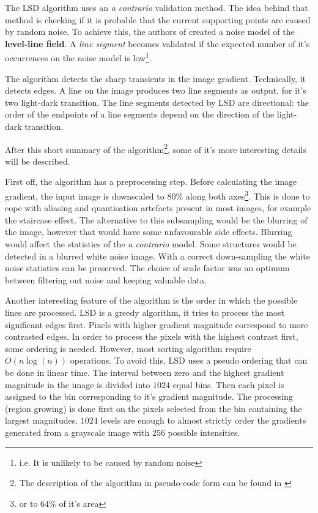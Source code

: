The LSD algorithm uses an \textit{a contrario} validation method.
The idea behind that method is checking if it is probable that the current supporting points are caused by random noise.
To achieve this, the authors of \cite{LSDDet} created a noise model of the \textbf{level-line field}.
A \textit{line segment} becomes validated if the expected number of it's occurrences on the noise model is low\footnote{i.e. It is unlikely to be caused by random noise}.

The algorithm detects the sharp transients in the image gradient.
Technically, it detects edges.
A line on the image produces two line segments as output, for it's two light-dark transition.
The line segments detected by LSD are directional: the order of the endpoints of a line segments depend on the direction of the light-dark transition.

After this short summary of the algorithm\footnote{The description of the algorithm in pseudo-code form can be found in \cite{LSDDet}}, some of it's more interesting details will be described.

First off, the algorithm has a preprocessing step.
Before calculating the image gradient, the input image is downscaled to $80\%$ along both axes\footnote{or to $64\%$ of it's area}.
This is done to cope with aliasing and quantisation artefacts present in most images, for example the staircase effect.
The alternative to this subsampling would be the blurring of the image, however that would have some unfavourable side effects.
Blurring would affect the statistics of the \textit{a contrario} model.
Some structures would be detected in a blurred white noise image.
With a correct down-sampling the white noise statistics can be preserved.
The choice of scale factor was an optimum between filtering out noise and keeping valuable data.

Another interesting feature of the algorithm is the order in which the possible lines are processed.
LSD is a greedy algorithm, it tries to process the most significant edges first.
Pixels with higher gradient magnitude correspond to more contrasted edges.
In order to process the pixels with the highest contrast first, some ordering is needed.
However, most sorting algorithm require $O(n \log(n))$ operations.
To avoid this, LSD uses a pseudo ordering that can be done in linear time.
The interval between zero and the highest gradient magnitude in the image is divided into $1024$ equal bins.
Then each pixel is assigned to the bin corresponding to it's gradient magnitude.
The processing (region growing) is done first on the pixels selected from the bin containing the largest magnitudes.
$1024$ levels are enough to almost strictly order the gradients generated from a grayscale image with $256$ possible intensities.

